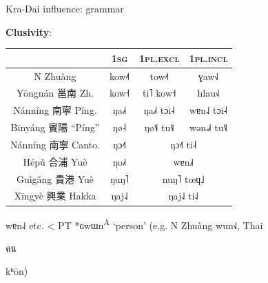 \documentclass{beamer}
\begin{document}
\begin{frame}[fragile]{Kra-Dai influence: grammar}

{\small \textbf{Clusivity}:\\
\bigskip
\begin{table}
\centering
\begin{tabular}{c|c c c}
     & \textsc{1sg} & \textsc{1pl.excl} & \textsc{1pl.incl}\\ \hline
     N Zhuàng & kow˨˦ & tow˨˦ & ɣaw˧˩\\
     Yōngnán 邕南 Zh. & kow˧ & ti˥ kow˧ & hlau˧˩\\
     Nánníng 南寧 Píng. & ŋa˩˧ & ŋa˩˧ tɔi˨ & wɐn˨˩ tɔi˨\\
     Bīnyáng 賓陽 \enquote{Píng} & ŋø˨ & ŋø˦˩ tu˦˩ & wən˨˩˧ tu˦˩\\ \hline
     Nánníng 南寧 Canto. & ŋɔ˨˦ & \multicolumn{2}{c}{ŋɔ˨˦ ti˨}\\
     Hépǔ 合浦 Yuè & ŋo˩˧ & \multicolumn{2}{c}{wɐn˩˧}\\
     Guìgǎng 貴港 Yuè & ŋuŋ˥ & \multicolumn{2}{c}{nuŋ˥ tœɥ˩}\\
     Xīngyè 興業 Hakka & ŋaj˨˩ & \multicolumn{2}{c}{ŋaj˨˩ ti˨˩}\\
\end{tabular}
\end{table}
\bigskip
{\footnotesize wɐn˨˩ etc. < PT *ɢwɯn\textsuperscript{A} \enquote*{person} (e.g. N Zhuàng wun˧˩, Thai \begin{thai}คน\end{thai} kʰōn)}\\
}
\end{frame}
\end{document}
